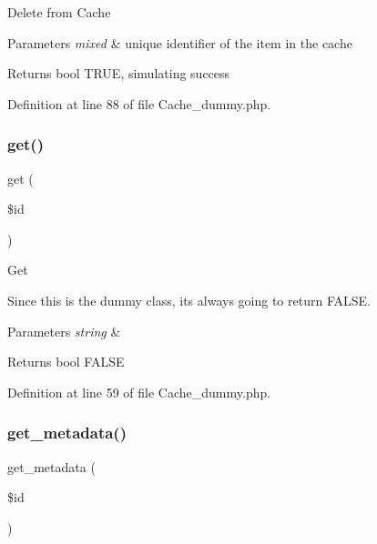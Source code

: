 Delete from Cache


\begin{DoxyParams}{Parameters}
{\em mixed} & unique identifier of the item in the cache \\
\hline
\end{DoxyParams}
\begin{DoxyReturn}{Returns}
bool T\+R\+UE, simulating success 
\end{DoxyReturn}


Definition at line 88 of file Cache\+\_\+dummy.\+php.

\mbox{\label{class_c_i___cache__dummy_a50e3bfb586b2f42932a6a93f3fbb0828}} 
\subsubsection{\texorpdfstring{get()}{get()}}
{\footnotesize\ttfamily get (\begin{DoxyParamCaption}\item[{}]{\$id }\end{DoxyParamCaption})}

Get

Since this is the dummy class, it\textquotesingle{}s always going to return F\+A\+L\+SE.


\begin{DoxyParams}{Parameters}
{\em string} & \\
\hline
\end{DoxyParams}
\begin{DoxyReturn}{Returns}
bool F\+A\+L\+SE 
\end{DoxyReturn}


Definition at line 59 of file Cache\+\_\+dummy.\+php.

\mbox{\label{class_c_i___cache__dummy_a59635cf18e997c5141bffa05ff7622e0}} 
\subsubsection{\texorpdfstring{get\_metadata()}{get\_metadata()}}
{\footnotesize\ttfamily get\+\_\+metadata (\begin{DoxyParamCaption}\item[{}]{\$id }\end{DoxyParamCaption})}

